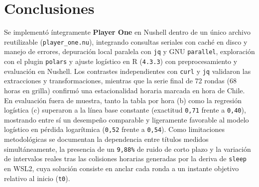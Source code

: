 \documentclass[11pt,a4paper]{article}
\begin{document}
\section{Conclusiones}

Se implementó íntegramente \textbf{Player One} en Nushell dentro de un único archivo reutilizable (\texttt{player\_one.nu}), integrando consultas seriales con caché en disco y manejo de errores, depuración local paralela con \texttt{jq} y GNU \texttt{parallel}, exploración con el plugin \texttt{polars} y ajuste logístico en R (\texttt{4.3.3}) con preprocesamiento y evaluación en Nushell. Los contrastes independientes con \texttt{curl} y \texttt{jq} validaron las extracciones y transformaciones, mientras que la serie final de 72 rondas (68 horas en grilla) confirmó una estacionalidad horaria marcada en hora de Chile. En evaluación fuera de muestra, tanto la tabla por hora (b) como la regresión logística (c) superaron a la línea base constante (exactitud \texttt{0,71} frente a \texttt{0,40}), mostrando entre sí un desempeño comparable y ligeramente favorable al modelo logístico en pérdida logarítmica (\texttt{0,52} frente a \texttt{0,54}). Como limitaciones metodológicas se documentan la dependencia entre títulos medidos simultáneamente, la presencia de un \texttt{9,88\%} de ruido de corto plazo y la variación de intervalos reales tras las colisiones horarias generadas por la deriva de \texttt{sleep} en WSL2, cuya solución consiste en anclar cada ronda a un instante objetivo relativo al inicio (\texttt{t0}).
\end{document}

